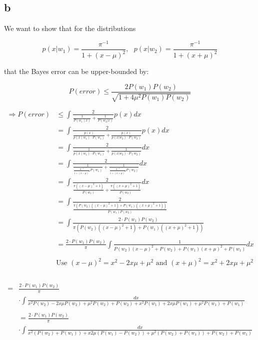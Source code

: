 \subsection{b}
We want to show that for the distributions

\begin{center}
    \begin{equation}
        p(x|w_{1})=\frac{\pi^{-1}}{1+(x-\mu)^{2}},\text{ } p(x|w_{2})=\frac{\pi^{-1}}{1+(x+\mu)^{2}}
    \end{equation}
\end{center}
that the Bayes error can be upper-bounded by:

\begin{center}
\begin{equation}
    P(error)\leq\frac{2P(w_{1})P(w_{2})}{\sqrt{1+4\mu^{2}P(w_{1})P(w_{2})}}
\end{equation}
\end{center}

\begin{align*}
\Rightarrow P(error) &\leq\int\frac{2}{\frac{1}{P(w_{1}\mid x)}+\frac{1}{P(w_2|x)}} p(x) dx\\
&=\int\frac{2}{\frac{p(x)}{p(x\mid w_{1})\cdot P(w_{1})}+\frac{p(x)}{p(x|w_{2})\cdot P(w_{2})}} p(x) dx\\
&=\int\frac{2}{\frac{1}{p(x\mid w_{1})\cdot P(w_{1})}+\frac{1}{p(x|w_{2})\cdot P(w_{2})}} dx\\
&=\int\frac{2}{\frac{1}{\frac{\pi^{-1}}{1+(x-\mu)^{2}}P(w_{1})}+\frac{1}{\frac{\pi^{-1}}{1+(x+\mu)^{2}}P(w_{2})}}dx\\
&=\int\frac{2}{\frac{\pi((x-\mu)^{2}+1)}{P(w_{1})}+\frac{\pi((x+\mu)^{2}+1)}{P(w_{2})}}dx\\
&=\int\frac{2}{\frac{\pi(P(w_{2})((x-\mu)^{2}+1)+P(w_{1})((x+\mu)^{2}+1))}{P(w_{1})P(w_{2})}}\\
&=\int\frac{2\cdot P(w_{1})P(w_{2})}{\pi(P(w_{2})((x-\mu)^{2}+1)+P(w_{1})((x+\mu)^{2}+1))}\\
\\
&=\frac{2\cdot P(w_{1})P(w_{2})}{\pi}\int\frac{1}{P(w_{2})(x-\mu)^{2}+P(w_{2})+P(w_{1})(x+\mu)^{2}+P(w_{1})}dx\\
\\
&\text{Use } (x-\mu)^{2}=x^{2}-2x\mu+\mu^{2} \text{ and } (x+\mu)^{2}=x^{2}+2x\mu+\mu^{2}\\
\end{align*}
\\
\begin{align*}
=&\frac{2\cdot P(w_{1})P(w_{2})}{\pi}\\
&\cdot\int\frac{dx}{x^{2}P(w_{2})-2x\mu P(w_{2})+\mu^{2}P(w_{2})+P(w_{2})+x^{2}P(w_{1})+2x\mu P(w_{1})+\mu^{2}P(w_{1})+P(w_{1})}\\
\\
&=\frac{2\cdot P(w_{1})P(w_{2})}{\pi}\\
&\cdot\int\frac{dx}{x^{2}(P(w_{2})+P(w_{1}))+x2\mu(P(w_{1})-P(w_{2}))+\mu^{2}(P(w_{2})+P(w_{1}))+P(w_{2})+P(w_{1})}
\end{align*}

